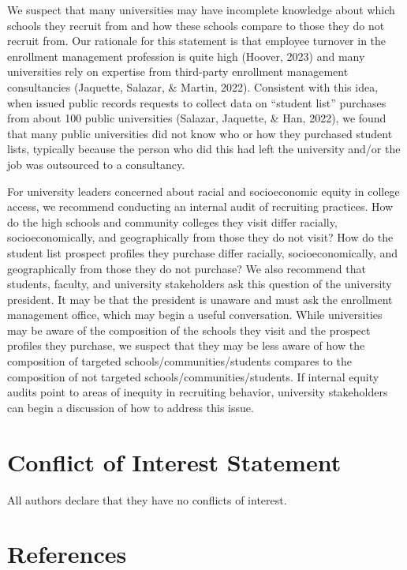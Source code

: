 \documentclass[
  12pt,
]{article}
\begin{document}
We suspect that many universities may have incomplete knowledge about which schools they recruit from and how these schools compare to those they do not recruit from. Our rationale for this statement is that employee turnover in the enrollment management profession is quite high (Hoover, 2023) and many universities rely on expertise from third-party enrollment management consultancies (Jaquette, Salazar, \& Martin, 2022). Consistent with this idea, when issued public records requests to collect data on ``student list'' purchases from about 100 public universities (Salazar, Jaquette, \& Han, 2022), we found that many public universities did not know who or how they purchased student lists, typically because the person who did this had left the university and/or the job was outsourced to a consultancy.

For university leaders concerned about racial and socioeconomic equity in college access, we recommend conducting an internal audit of recruiting practices. How do the high schools and community colleges they visit differ racially, socioeconomically, and geographically from those they do not visit? How do the student list prospect profiles they purchase differ racially, socioeconomically, and geographically from those they do not purchase? We also recommend that students, faculty, and university stakeholders ask this question of the university president. It may be that the president is unaware and must ask the enrollment management office, which may begin a useful conversation. While universities may be aware of the composition of the schools they visit and the prospect profiles they purchase, we suspect that they may be less aware of how the composition of targeted schools/communities/students compares to the composition of not targeted schools/communities/students. If internal equity audits point to areas of inequity in recruiting behavior, university stakeholders can begin a discussion of how to address this issue.

\hypertarget{conflict-of-interest-statement}{%
\section{Conflict of Interest Statement}\label{conflict-of-interest-statement}}

All authors declare that they have no conflicts of interest.

\singlespacing

\hypertarget{references}{%
\section{References}\label{references}}
\end{document}
